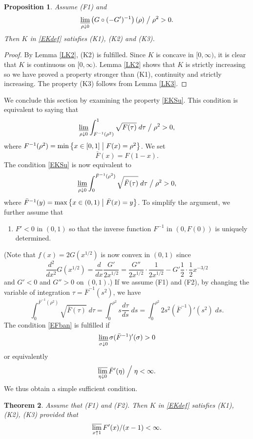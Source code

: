 \documentclass[11pt]{amsart} %
\numberwithin{equation}{section}
\newtheorem{thm}{Theorem}[section]
\newtheorem{prop}[thm]{Proposition}
\begin{document}
%
\begin{prop} \label{PSuff}
Assume (F1) and
\begin{equation} \label{EKSu}
\varliminf_{\rho\downarrow0} \left( G \circ (-G')^{-1} \right) (\rho) \bigm/ \rho^2 > 0.
\end{equation}
Then $K$ in \eqref{EKdef} satisfies (K1), (K2) and (K3).
\end{prop}
%
\begin{proof}
By Lemma \ref{LK2}, (K2) is fulfilled.
 Since $K$ is concave in $[0,\infty)$, it is clear that $K$ is continuous on $[0,\infty)$.
 Lemma \ref{LK2} shows that $K$ is strictly increasing so we have proved a property stronger than (K1), continuity and strictly increasing.
 The property (K3) follows from Lemma \ref{LK3}.
\end{proof}

We conclude this section by examining the property \eqref{EKSu}.
 This condition is equivalent to saying that
\[
	\varliminf_{\rho\downarrow0} \int_{F^{-1}(\rho^2)}^1 \sqrt{F(\tau)}\; d\tau \bigm/ \rho^2 > 0,
\]
where $F^{-1}(\rho^2)=\min\left\{x\in[0,1] \bigm| F(x)=\rho^2 \right\}$.
 We set
\[
	\bar{F}(x) = F(1-x).
\]
The condition \eqref{EKSu} is now equivalent to
\begin{equation} \label{EFban}
	\varliminf_{\rho\downarrow0} \int_0^{\bar{F}^{-1}(\rho^2)} \sqrt{\bar{F}(\tau)} \; d\tau \bigm/ \rho^2 > 0,
\end{equation}
where $\bar{F}^{-1}(y)=\max\left\{x\in(0,1)\bigm|\bar{F}(x)=y\right\}$.
 To simplify the argument, we further assume that
\begin{enumerate}
\item[(F2)] $F'<0$ in $(0,1)$ so that the inverse function $F^{-1}$ in $\left(0,F(0)\right)$ is uniquely determined.
\end{enumerate}
(Note that $f(x)=2G(x^{1/2})$ is now convex in $(0,1)$ since
\[
	\frac{d^2}{dx^2} G(x^{1/2}) = \frac{d}{dx} \frac{G'}{2x^{1/2}}
	= \frac{G''}{2x^{1/2}} \cdot \frac{1}{2x^{1/2}}
	- G' \frac12 \cdot \frac12 x^{-3/2}
\]
and $G'<0$ and $G''>0$ on $(0,1)$.)
 If we assume (F1) and (F2), by changing the variable of integration $\tau=\bar{F}^{-1}(s^2)$, we have
\[
	\int_0^{\bar{F}^{-1}(\rho^2)} \sqrt{\bar{F}(\tau)} \; d\tau
	= \int_0^{\rho^2} s \frac{d\tau}{ds}\; ds
	= \int_0^{\rho^2} 2s^2 (\bar{F}^{-1})' (s^2)\; ds.
\]
The condition \eqref{EFban} is fulfilled if 
\[
	\varliminf_{\sigma\downarrow0} \sigma (\bar{F}^{-1})' (\sigma) > 0
\]
or equivalently
\[
	\varlimsup_{\eta\downarrow0} \bar{F}'(\eta)\Bigm/ \eta <\infty.
\]
We thus obtain a simple sufficient condition.
\begin{thm} \label{TSuff}
Assume that (F1) and (F2).
 Then $K$ in \eqref{EKdef} satisfies (K1), (K2), (K3) provided that
\[
	\varlimsup_{x\uparrow1} F'(x) / (x-1) <\infty.
\]
\end{thm}
\end{document}
